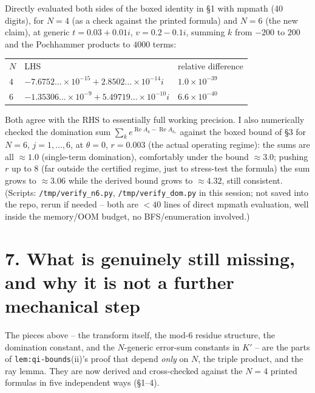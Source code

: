 \documentclass[11pt]{article}
\begin{document}
Directly evaluated both sides of the boxed identity in \S1 with mpmath (40 digits), for $N=4$
(as a check against the printed formula) and $N=6$ (the new claim), at generic $t=0.03+0.01i$,
$v=0.2-0.1i$, summing $k$ from $-200$ to $200$ and the Pochhammer products to $4000$ terms:
\begin{center}
\begin{tabular}{lll}
$N$ & LHS & relative difference \\
$4$ & $-7.6752\ldots\times10^{-15}+2.8502\ldots\times10^{-14}i$ & $1.0\times10^{-39}$\\
$6$ & $-1.35306\ldots\times10^{-9}+5.49719\ldots\times10^{-10}i$ & $6.6\times10^{-40}$\\
\end{tabular}
\end{center}
Both agree with the RHS to essentially full working precision. I also numerically checked the
domination sum $\sum_ke^{\operatorname{Re}A_k-\operatorname{Re}A_{k_*}}$ against the boxed bound
of \S3 for $N=6$, $j=1,\dots,6$, at $\theta=0$, $r=0.003$ (the actual operating regime): the sums
are all $\approx1.0$ (single-term domination), comfortably under the bound $\approx3.0$; pushing
$r$ up to $8$ (far outside the certified regime, just to stress-test the formula) the sum grows to
$\approx3.06$ while the derived bound grows to $\approx4.32$, still consistent. (Scripts:
\texttt{/tmp/verify\_n6.py}, \texttt{/tmp/verify\_dom.py} in this session; not saved into the
repo, rerun if needed -- both are $<40$ lines of direct mpmath evaluation, well inside the
memory/OOM budget, no BFS/enumeration involved.)

\section*{7. What is genuinely still missing, and why it is not a further mechanical step}

The pieces above -- the transform itself, the mod-6 residue structure, the domination constant,
and the $N$-generic error-sum constants in $K'$ -- are the parts of \texttt{lem:qi-bounds}(ii)'s
proof that depend \emph{only} on $N$, the triple product, and the ray lemma. They are now derived
and cross-checked against the $N=4$ printed formulas in five independent ways (\S1--4).
\end{document}
